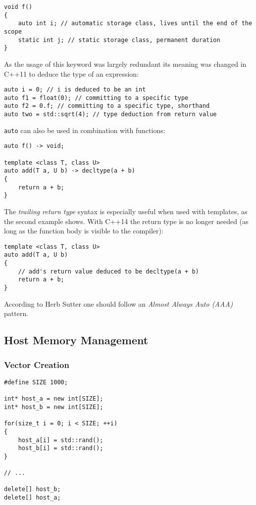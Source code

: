 \begin{lstlisting}
void f()
{
    auto int i; // automatic storage class, lives until the end of the scope
    static int j; // static storage class, permanent duration
}
\end{lstlisting}

As the usage of this keyword was largely redundant its meaning was changed in C++11 to deduce the type of an expression:

\begin{lstlisting}
auto i = 0; // i is deduced to be an int
auto f1 = float(0); // committing to a specific type
auto f2 = 0.f; // committing to a specific type, shorthand
auto two = std::sqrt(4); // type deduction from return value
\end{lstlisting}

\texttt{auto} can also be used in combination with functions:

\begin{lstlisting}
auto f() -> void;

template <class T, class U>
auto add(T a, U b) -> decltype(a + b)
{
    return a + b;
}
\end{lstlisting}

The \textit{trailing return type} syntax is especially useful when used with templates, as the second example shows. With C++14 the return type is no longer needed (as long as the function body is visible to the compiler):

\begin{lstlisting}
template <class T, class U>
auto add(T a, U b)
{
    // add's return value deduced to be decltype(a + b)
    return a + b;
}
\end{lstlisting}

According to Herb Sutter\cite{sutteraaa} one should follow an \textit{Almost Always Auto (AAA)} pattern.

\subsection{Host Memory Management}

\subsubsection{Vector Creation}

\begin{lstlisting}
#define SIZE 1000;

int* host_a = new int[SIZE];
int* host_b = new int[SIZE];

for(size_t i = 0; i < SIZE; ++i)
{
    host_a[i] = std::rand();
    host_b[i] = std::rand();
}

// ...

delete[] host_b;
delete[] host_a;
\end{lstlisting}

